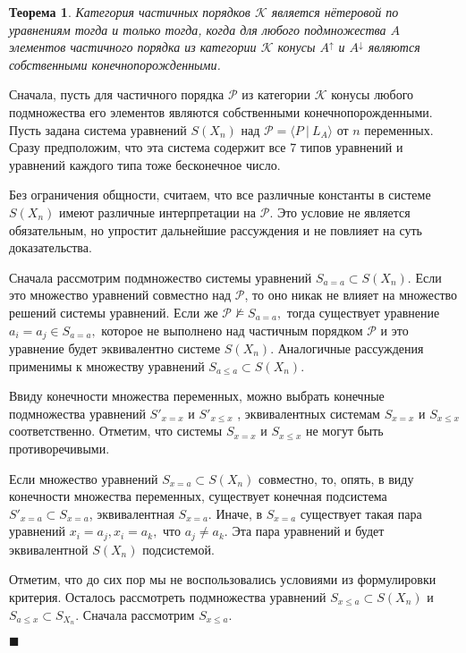 \documentclass[12pt]{article}
\theoremstyle{break}
\newtheorem{Th}{Теорема}
\newenvironment{Proof} %
	{\par\noindent{\bf Доказательство.}} %
	{\hfill$\scriptstyle\blacksquare$} %
\def\P{\mathcal{P}}
\begin{document}
		\begin{Th}
			Категория частичных порядков $\mathcal{K}$ является нётеровой по уравнениям тогда и только тогда, когда для любого подмножества $A$ элементов частичного порядка из категории $\mathcal{K}$ конусы $A^{\uparrow}$ и $A^{\downarrow}$ являются собственными конечнопорожденными.
		\end{Th}

		\begin{Proof}
			Сначала, пусть для частичного порядка $\P$ из категории $\mathcal{K}$ конусы любого подмножества его элементов являются собственными конечнопорожденными. Пусть задана система уравнений $S(X_n)$ над $\P = \langle P~|~L_A\rangle$ от $n$ переменных. Сразу предположим, что эта система содержит все 7 типов уравнений и уравнений каждого типа тоже бесконечное число.

			Без ограничения общности, считаем, что все различные константы в системе $S(X_n)$ имеют различные интерпретации на $\P$. Это условие не является обязательным, но упростит дальнейшие рассуждения и не повлияет на суть доказательства.

			Сначала рассмотрим подмножество системы уравнений $S_{a=a}\subset S(X_n)$. Если это множество уравнений совместно над $\P$, то оно никак не влияет на множество решений системы уравнений. Если же $\P\nvDash S_{a=a},$ тогда существует уравнение $a_i=a_j\in S_{a=a},$ которое не выполнено над частичным порядком $\P$ и это уравнение будет эквивалентно системе $S(X_n).$ Аналогичные рассуждения применимы к множеству уравнений $S_{a\leqslant a}\subset S(X_n).$

			Ввиду конечности множества переменных, можно выбрать конечные подмножества уравнений $S'_{x=x}$ и $S'_{x\leqslant x}$ , эквивалентных системам $S_{x=x}$ и $S_{x\leqslant x}$ соответственно. Отметим, что системы $S_{x=x}$ и $S_{x\leqslant x}$ не могут быть противоречивыми.

			Если множество уравнений $S_{x=a}\subset S(X_n)$ совместно, то, опять, в виду конечности множества переменных, существует конечная подсистема $S'_{x=a}\subset S_{x=a}$, эквивалентная $S_{x=a}.$ Иначе, в $S_{x=a}$  существует такая пара уравнений $x_i=a_j, x_i=a_k,$ что $a_j\neq a_k$. Эта пара уравнений и будет эквивалентной $S(X_n)$ подсистемой.

			Отметим, что до сих пор мы не воспользовались условиями из формулировки критерия. Осталось рассмотреть подмножества уравнений $S_{x\leqslant a}\subset S(X_n)$ и $S_{a\leqslant x}\subset S_{X_n}$. Сначала рассмотрим $S_{x\leqslant a}$.


\end{Proof}
\end{document}
